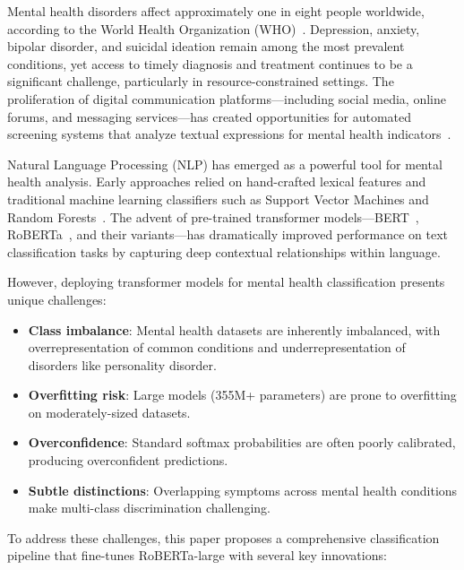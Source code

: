 \documentclass[conference, 10pt]{IEEEtran}
\begin{document}
Mental health disorders affect approximately one in eight people worldwide, according to the World Health Organization (WHO)~\cite{who2022}. Depression, anxiety, bipolar disorder, and suicidal ideation remain among the most prevalent conditions, yet access to timely diagnosis and treatment continues to be a significant challenge, particularly in resource-constrained settings. The proliferation of digital communication platforms—including social media, online forums, and messaging services—has created opportunities for automated screening systems that analyze textual expressions for mental health indicators~\cite{calvo2017natural}.

Natural Language Processing (NLP) has emerged as a powerful tool for mental health analysis. Early approaches relied on hand-crafted lexical features and traditional machine learning classifiers such as Support Vector Machines and Random Forests~\cite{coppersmith2015clpsych}. The advent of pre-trained transformer models—BERT~\cite{devlin2019bert}, RoBERTa~\cite{liu2019roberta}, and their variants—has dramatically improved performance on text classification tasks by capturing deep contextual relationships within language.

However, deploying transformer models for mental health classification presents unique challenges:
\begin{itemize}[noitemsep]
    \item \textbf{Class imbalance}: Mental health datasets are inherently imbalanced, with overrepresentation of common conditions and underrepresentation of disorders like personality disorder.
    \item \textbf{Overfitting risk}: Large models (355M+ parameters) are prone to overfitting on moderately-sized datasets.
    \item \textbf{Overconfidence}: Standard softmax probabilities are often poorly calibrated, producing overconfident predictions.
    \item \textbf{Subtle distinctions}: Overlapping symptoms across mental health conditions make multi-class discrimination challenging.
\end{itemize}

To address these challenges, this paper proposes a comprehensive classification pipeline that fine-tunes RoBERTa-large with several key innovations:
\end{document}
